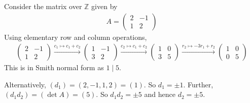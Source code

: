 \begin{example}
	Consider the matrix over $\mathbb Z$ given by
	\begin{align*}
		A = \begin{pmatrix}
			2 & -1 \\
			1 & 2
		\end{pmatrix}
	\end{align*}
	Using elementary row and column operations,
	\begin{align*}
		\begin{pmatrix}
			2 & -1 \\
			1 & 2
		\end{pmatrix} \xrightarrow{c_1 \mapsto c_1 + c_2} \begin{pmatrix}
			1 & -1 \\
			3 & 2
		\end{pmatrix} \xrightarrow{c_2 \mapsto c_1 + c_2} \begin{pmatrix}
			1 & 0 \\
			3 & 5
		\end{pmatrix} \xrightarrow{r_2 \mapsto -3r_1 + r_2} \begin{pmatrix}
			1 & 0 \\
			0 & 5
		\end{pmatrix}
	\end{align*}
	This is in Smith normal form as $1 \mid 5$.

	Alternatively, $(d_1) = (2, -1, 1, 2) = (1)$.
	So $d_1 = \pm 1$.
	Further, $(d_1 d_2) = (\det A) = (5)$.
	So $d_1 d_2 = \pm 5$ and hence $d_2 = \pm 5$.
\end{example}

